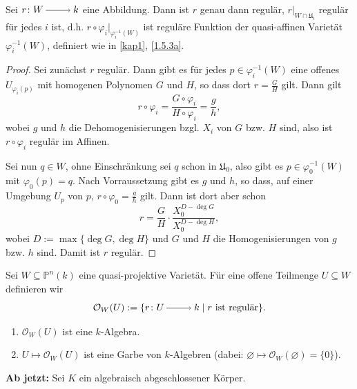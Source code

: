 \documentclass[a4paper,12pt,index=toc]{scrbook}
\theoremstyle{keinenummern} %
\def\O{\mathcal{O}}
\def\P{\mathbb{P}}
\def\U{\mathfrak{U}}
\newcommand{\leer}{\ensuremath{\varnothing}}
\newcommand{\restrict}[1]{|_{#1}}
\begin{document}
\begin{bem}\label{2.5.2}
Sei $r\colon W\ra k$ eine Abbildung. Dann ist $r$ genau dann regulär, $r\restrict{W\cap \U_{i}}$ regulär für jedes $i$ ist, d.h. $r\circ\varphi_{i}\restrict{\varphi_{i}^{-1}(W)}$ ist reguläre Funktion der quasi-affinen Varietät $\varphi_{i}^{-1}(W)$, definiert wie in \cref{kap1}, \cref{1.5.3a}.
\end{bem}
\begin{proof} Sei zunächst $r$ regulär. Dann gibt es für jedes $p\in\varphi_{i}^{-1}(W)$ eine offenes $U_{\varphi_{i}(p)}$ mit homogenen Polynomen $G$ und $H$, so dass dort $r=\frac{G}{H}$ gilt. Dann gilt
\[r\circ\varphi_{i}=\frac{G\circ\varphi_{i}}{H\circ\varphi_{i}}=\frac{g}{h},\]
wobei $g$ und $h$ die Dehomogenisierungen bzgl. $X_{i}$ von $G$ bzw. $H$ sind, also ist $r\circ\varphi_{i}$ regulär im Affinen.

Sei nun $q\in W$, ohne Einschränkung sei $q$ schon in $\U_{0}$, also gibt es $p\in\varphi_{0}^{-1}(W)$ mit $\varphi_{0}(p)=q$. Nach Vorraussetzung gibt es $g$ und $h$, so dass, auf einer Umgebung $U_{p}$ von $p$, $r\circ\varphi_{0}=\frac{g}{h}$ gilt. Dann ist dort aber schon
\[r=\frac{G}{H}\cdot\frac{X_{0}^{D-\deg G}}{X_{0}^{D-\deg H}},\]
wobei $D:=\max\{\deg G,\deg H\}$ und $G$ und $H$ die Homogenisierungen von $g$ bzw. $h$ sind. Damit ist $r$ regulär.
\end{proof}

\begin{db}\label{2.5.3}
Sei $W\subseteq\P^{n}(k)$ eine quasi-projektive Varietät. Für eine offene Teilmenge $U\subseteq W$ definieren wir 
\[\O_{W}(U):=\{r\colon U\ra k\mid r\text{ ist regulär}\}.\]
\begin{enumerate}
\item $\O_{W}(U)$ ist eine $k$-Algebra.
\item $U\mapsto\O_{W}(U)$ ist eine Garbe von $k$-Algebren (dabei: $\leer\mapsto\O_{W}(\leer)=\{0\}$).
\end{enumerate}\end{db}

\begin{w}
{\bf Ab jetzt:} Sei $K$ ein algebraisch abgeschlossener Körper.
\end{w}
\end{document}
